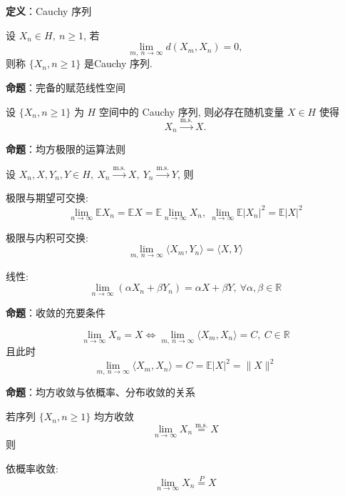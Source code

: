 \documentclass[openany]{ctexbook}
\theoremstyle{kaiti}
\theoremstyle{normal}
\begin{document}
\textbf{定义}：Cauchy 序列

设 $X_n\in H,~n\geqslant1$, 若
\begin{equation}
  \lim_{m,~n\to\infty}d(X_m,X_n)=0,
\end{equation}
则称 $\{X_n,n\geqslant1\}$ 是Cauchy 序列.

\textbf{命题}：完备的赋范线性空间

设 $\{X_n,n\geqslant1\}$ 为 $H$ 空间中的 Cauchy 序列, 则必存在随机变量 $X\in H$ 使得
\begin{equation}
  X_n\overset{\mathrm{m.s.}}{\rightarrow}X.
\end{equation}

\textbf{命题}：均方极限的运算法则

设 $X_n,X,Y_n,Y\in H,~X_n\overset{\mathrm{m.s.}}{\rightarrow}X,~Y_n\overset{\mathrm{m.s.}}{\rightarrow}Y$, 则

极限与期望可交换:
\begin{equation}
  \lim_{n\to\infty}\mathbb{E}X_n=\mathbb{E}X=\mathbb{E}\lim_{n\to\infty}X_n,~\lim_{n\to\infty}\mathbb{E}|X_n|^2=\mathbb{E}|X|^2
\end{equation}

极限与内积可交换:
\begin{equation}
  \lim_{m,~n\to\infty}\langle X_m,Y_n\rangle=\langle X,Y\rangle
\end{equation}

线性:
\begin{equation}
  \lim_{n\to\infty}(\alpha X_n+\beta Y_n)=\alpha X+\beta Y,~\forall \alpha,\beta\in\mathbb{R}
\end{equation}

\textbf{命题}：收敛的充要条件

\begin{equation}\lim_{n\to\infty}X_n=X\Leftrightarrow\lim_{m,~n\to\infty}\langle X_m,X_n\rangle=C,~C\in\mathbb{R}\end{equation} 且此时
\begin{equation}
  \lim_{m,~n\to\infty}\langle X_m,X_n\rangle=C=\mathbb{E}|X|^2=\|X\|^2
\end{equation}

\textbf{命题}：均方收敛与依概率、分布收敛的关系

若序列 $\{X_n,n\geqslant1\}$ 均方收敛
\begin{equation}
  \lim_{n\to\infty}X_n\overset{\mathrm{m.s.}}{=}X
\end{equation}
则

依概率收敛:
\begin{equation}
  \lim_{n\to\infty}X_n\overset{P}{=}X
\end{equation}
\end{document}
